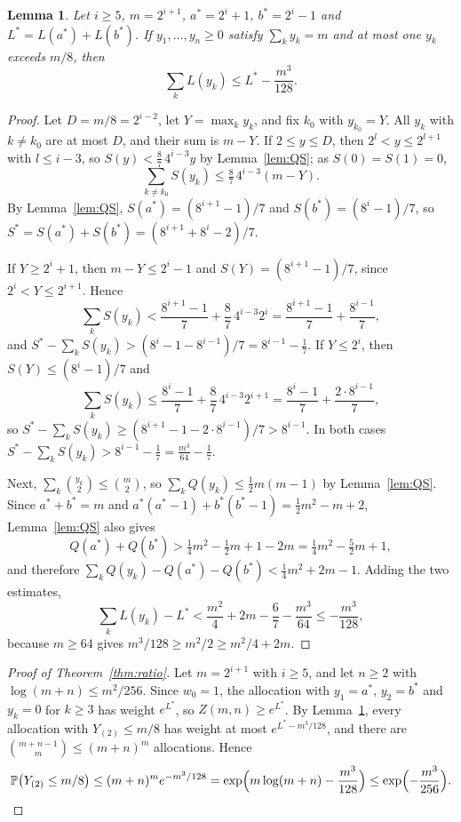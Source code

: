 \documentclass[11pt]{amsart}
\newtheorem{lemma}[theorem]{Lemma}
\theoremstyle{remark}
\numberwithin{equation}{section}
\newcommand{\Pp}{\mathbb P}
\begin{document}
\begin{lemma}\label{lem:max}
Let $i\ge5$, $m=2^{i+1}$, $a^*=2^i+1$, $b^*=2^i-1$ and $L^*=L(a^*)+L(b^*)$. If $y_1,\dots,y_n\ge0$ satisfy $\sum_ky_k=m$ and at most one $y_k$ exceeds $m/8$, then
\[
\sum_kL(y_k)\le L^*-\frac{m^3}{128}.
\]
\end{lemma}

\begin{proof}
Let $D=m/8=2^{i-2}$, let $Y=\max_ky_k$, and fix $k_0$ with $y_{k_0}=Y$. All $y_k$ with $k\ne k_0$ are at most $D$, and their sum is $m-Y$. If $2\le y\le D$, then $2^l<y\le2^{l+1}$ with $l\le i-3$, so $S(y)<\frac87\,4^{i-3}y$ by Lemma~\ref{lem:QS}; as $S(0)=S(1)=0$,
\[
\sum_{k\ne k_0}S(y_k)\le\tfrac87\,4^{i-3}(m-Y).
\]
By Lemma~\ref{lem:QS}, $S(a^*)=(8^{i+1}-1)/7$ and $S(b^*)=(8^i-1)/7$, so $S^*=S(a^*)+S(b^*)=(8^{i+1}+8^i-2)/7$.

If $Y\ge2^i+1$, then $m-Y\le2^i-1$ and $S(Y)=(8^{i+1}-1)/7$, since $2^i<Y\le2^{i+1}$. Hence
\[
\sum_kS(y_k)<\frac{8^{i+1}-1}7+\frac87\,4^{i-3}2^i=\frac{8^{i+1}-1}7+\frac{8^{i-1}}7,
\]
and $S^*-\sum_kS(y_k)>(8^i-1-8^{i-1})/7=8^{i-1}-\frac17$. If $Y\le2^i$, then $S(Y)\le(8^i-1)/7$ and
\[
\sum_kS(y_k)\le\frac{8^i-1}7+\frac87\,4^{i-3}2^{i+1}=\frac{8^i-1}7+\frac{2\cdot8^{i-1}}7,
\]
so $S^*-\sum_kS(y_k)\ge(8^{i+1}-1-2\cdot8^{i-1})/7>8^{i-1}$. In both cases $S^*-\sum_kS(y_k)>8^{i-1}-\frac17=\frac{m^3}{64}-\frac17$.

Next, $\sum_k\binom{y_k}2\le\binom m2$, so $\sum_kQ(y_k)\le\frac12m(m-1)$ by Lemma~\ref{lem:QS}. Since $a^*+b^*=m$ and $a^*(a^*-1)+b^*(b^*-1)=\frac12m^2-m+2$, Lemma~\ref{lem:QS} also gives
\[
Q(a^*)+Q(b^*)>\tfrac14m^2-\tfrac12m+1-2m=\tfrac14m^2-\tfrac52m+1,
\]
and therefore $\sum_kQ(y_k)-Q(a^*)-Q(b^*)<\frac14m^2+2m-1$. Adding the two estimates,
\[
\sum_kL(y_k)-L^*<\frac{m^2}4+2m-\frac67-\frac{m^3}{64}\le-\frac{m^3}{128},
\]
because $m\ge64$ gives $m^3/128\ge m^2/2\ge m^2/4+2m$.
\end{proof}

\begin{proof}[Proof of Theorem~\ref{thm:ratio}]
Let $m=2^{i+1}$ with $i\ge5$, and let $n\ge2$ with $\log(m+n)\le m^2/256$. Since $w_0=1$, the allocation with $y_1=a^*$, $y_2=b^*$ and $y_k=0$ for $k\ge3$ has weight $e^{L^*}$, so $Z(m,n)\ge e^{L^*}$. By Lemma~\ref{lem:max}, every allocation with $Y_{(2)}\le m/8$ has weight at most $e^{L^*-m^3/128}$, and there are $\binom{m+n-1}m\le(m+n)^m$ allocations. Hence
\[
\Pp\bigl(Y_{(2)}\le m/8\bigr)\le(m+n)^me^{-m^3/128}=\exp\Bigl(m\log(m+n)-\frac{m^3}{128}\Bigr)\le\exp\Bigl(-\frac{m^3}{256}\Bigr).\qedhere
\]
\end{proof}
\end{document}
